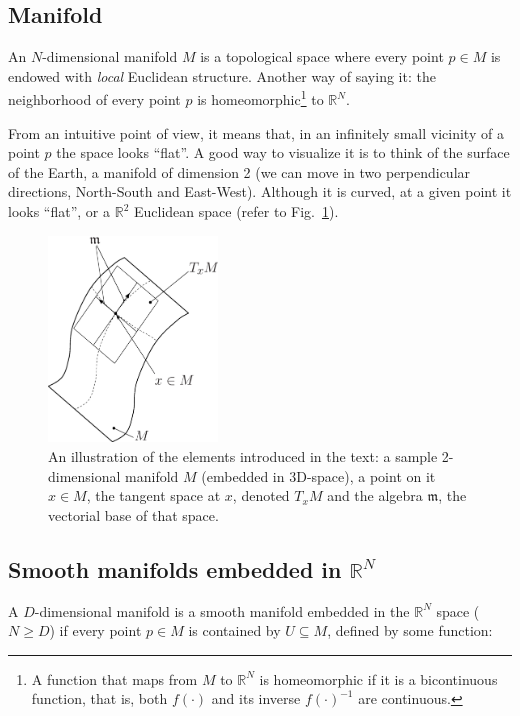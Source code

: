 \documentclass[a4paper,11pt]{report}
\begin{document}
\subsection{Manifold}

An $N$-dimensional manifold $M$ is a topological space where 
every point $p \in M$ is endowed with \emph{local} Euclidean structure.
Another way of saying it: the neighborhood of every point $p$ 
is homeomorphic\footnote{A 
function that maps from $M$ to $\mathbb{R}^N$ is homeomorphic if it is 
a bicontinuous function, that is, both $f(\cdot)$ and its inverse $f(\cdot)^{-1}$
are continuous.} to $\mathbb{R}^N$.

From an intuitive point of view, it means that, in an infinitely small vicinity of
a point $p$ the space looks ``flat''. A good way to visualize it is to think 
of the surface of the Earth, a manifold of dimension 2 (we can move in two perpendicular 
directions, North-South and East-West). Although it is curved, at a given point 
it looks ``flat'', or a $\mathbb{R}^2$ Euclidean space (refer to Fig.~\ref{fig:manifold}).


\begin{figure}
\centering
\includegraphics[width=0.40\textwidth]{imgs/manifold_tangent_space.eps}
\caption{An illustration of the elements introduced in the text:
a sample 2-dimensional manifold $M$ (embedded in 3D-space), 
a point on it $x \in M$, the tangent space at $x$, 
denoted $T_x M$ and the algebra $\mathfrak{m}$, the vectorial base of that space.
}
\label{fig:manifold}
\end{figure}

\subsection{Smooth manifolds embedded in $\mathbb{R}^N$}
\label{sect:smooth_manif}

A $D$-dimensional manifold is a smooth manifold embedded in the 
$\mathbb{R}^N$ space ($N \geq D$) if every point $p \in M$ is 
contained by $U \subseteq M$, defined by some function:
\end{document}
